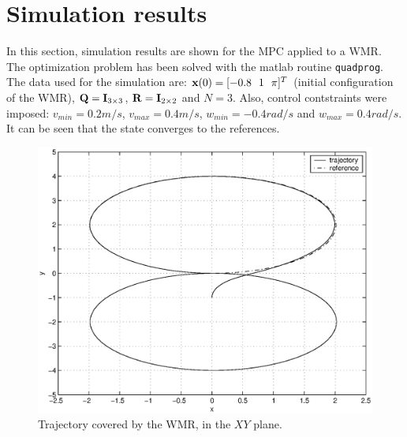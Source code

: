 \documentclass[twocolumn]{IEEEtran} %
\begin{document}
\section{Simulation results}\label{sec:simulations}
In this section, simulation results are shown for the MPC applied to a WMR. The optimization problem has been solved with the {\sc matlab} routine {\tt quadprog}. The data used for the simulation are: ${\bf x}(0)=[-0.8~~1~~\pi]^T$ (initial configuration of the WMR), ${\bf Q}={\bf I}_{3\times 3}$, ${\bf R}={\bf I}_{2\times 2}$ and $N=3$. Also, control contstraints were imposed: $v_{min}=0.2 m/s$, $v_{max}=0.4 m/s$, $w_{min}=-0.4 rad/s$ and $w_{max}=0.4 rad/s$. It can be seen that the state converges to the references. 
\begin{figure}[H]\begin{center}
    \includegraphics[width=.95\linewidth]{Figures/traj8.eps}
    \caption{Trajectory covered by the WMR, in the $XY$ plane.}
    \label{fig:traj8}
\end{center}\end{figure}
\end{document}
